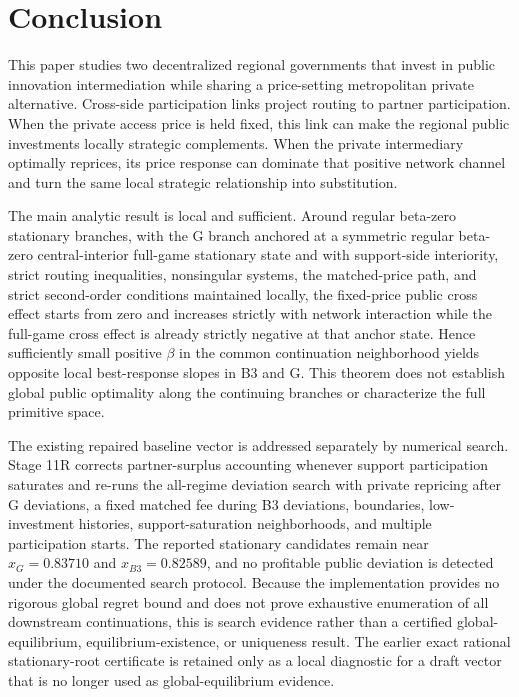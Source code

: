 \section{Conclusion}\label{sec:conclusion}

This paper studies two decentralized regional governments that invest in public innovation intermediation while sharing a price-setting metropolitan private alternative. Cross-side participation links project routing to partner participation. When the private access price is held fixed, this link can make the regional public investments locally strategic complements. When the private intermediary optimally reprices, its price response can dominate that positive network channel and turn the same local strategic relationship into substitution.

The main analytic result is local and sufficient. Around regular beta-zero stationary branches, with the G branch anchored at a symmetric regular beta-zero central-interior full-game stationary state and with support-side interiority, strict routing inequalities, nonsingular systems, the matched-price path, and strict second-order conditions maintained locally, the fixed-price public cross effect starts from zero and increases strictly with network interaction while the full-game cross effect is already strictly negative at that anchor state. Hence sufficiently small positive $\beta$ in the common continuation neighborhood yields opposite local best-response slopes in B3 and G. This theorem does not establish global public optimality along the continuing branches or characterize the full primitive space.

The existing repaired baseline vector is addressed separately by numerical search. Stage 11R corrects partner-surplus accounting whenever support participation saturates and re-runs the all-regime deviation search with private repricing after G deviations, a fixed matched fee during B3 deviations, boundaries, low-investment histories, support-saturation neighborhoods, and multiple participation starts. The reported stationary candidates remain near $x_G=0.83710$ and $x_{B3}=0.82589$, and no profitable public deviation is detected under the documented search protocol. Because the implementation provides no rigorous global regret bound and does not prove exhaustive enumeration of all downstream continuations, this is search evidence rather than a certified global-equilibrium, equilibrium-existence, or uniqueness result. The earlier exact rational stationary-root certificate is retained only as a local diagnostic for a draft vector that is no longer used as global-equilibrium evidence.

